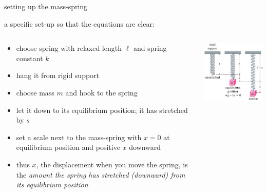 \documentclass{beamer}
\begin{document}
\begin{frame}{setting up the mass-spring}

a specific set-up so that the equations are clear:
\begin{columns}
\begin{column}{0.6\textwidth}
\begin{itemize}
\small
\item choose spring with relaxed length $\ell$ and spring constant $k$
\item hang it from rigid support
\item choose mass $m$ and hook to the spring
\item let it down to its equilibrium position; it has stretched by $s$
\item set a scale next to the mass-spring with $x=0$ at equilibrium position and positive $x$ downward
\item thus $x$, the displacement when you move the spring, is the \emph{amount the spring has stretched (downward) from its equilibrium position}
\end{itemize}
\end{column}
\begin{column}{0.4\textwidth}
\includegraphics[width=\textwidth]{figs/mass-spring-setup}
\end{column}
\end{columns}
\end{frame}
\end{document}
